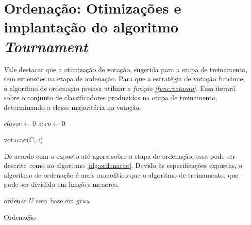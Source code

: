 \section{Ordenação: Otimizações e implantação do algoritmo \emph{Tournament}}

Vale destacar que a otimização de votação, sugerida para a etapa de treinamento, tem extensões na etapa de ordenação. Para que a estratégia de votação funcione, o algoritmo de ordenação precisa utilizar a \emph{função \ref{func:votacao}}. Essa iterará sobre o conjunto de classificadores produzidos na etapa de treinamento, determinando a classe majoritária na votação.

\begin{function}[h!]

    $classe \gets 0$\;
    $zero \gets 0$\;




    \caption{votacao(C, i)}
    \label{func:votacao}
\end{function}

De acordo com o exposto até agora sobre a etapa de ordenação, essa pode ser descrita como no algoritmo \ref{alg:ordenacao}. Devido às especificações expostas, o algoritmo de ordenação é mais monolítico que o algoritmo de treinamento, que pode ser dividido em funções menores.

\begin{algorithm}[h!]


    ordenar $U$ com base em $grau$\;

    \caption{Ordenação}
    \label{alg:ordenacao}
\end{algorithm}


